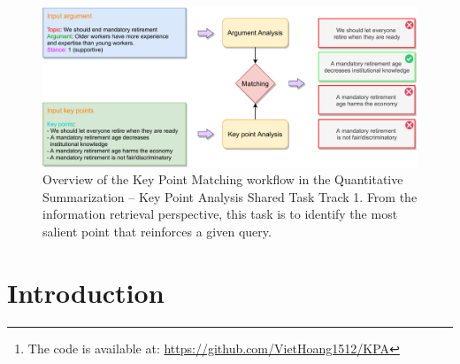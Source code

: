 \begin{figure}[ht!]
\centering
\includegraphics[scale=0.74]{figures/KPA-workflow.pdf}
\caption{Overview of the Key Point Matching workflow in the Quantitative Summarization – Key Point Analysis Shared Task Track 1. From the information retrieval perspective, this task is to identify the most salient point that reinforces a given query.}
\label{fig:workflow}
\end{figure}


\begin{abstract}
Key Point Analysis (KPA) is one of the most essential tasks in building an Opinion Summarization system, which is capable of generating key points for a collection of arguments toward a particular topic. Furthermore, KPA allows quantifying the coverage of each summary by counting its matched arguments. With the aim of creating high-quality summaries, it is necessary to have an in-depth understanding of each individual argument as well as its universal semantic in a specified context. In this paper, we introduce a promising model, named Matching the Statements (MTS) that incorporates the discussed topic information into arguments/key points comprehension to fully understand their meanings, thus accurately performing ranking and retrieving best-match key points for an input argument. Our approach\footnote{The code is available at: \url{https://github.com/VietHoang1512/KPA}} has achieved the $4^{th}$ place in Track 1 of the Quantitative Summarization – Key Point Analysis Shared Task by IBM, yielding a competitive performance of $0.8956\:(3^{rd})$ and $0.9632\:(7^{th})$ strict and relaxed mean Average Precision, respectively.
\end{abstract}

\section{Introduction}
\label{sec:intro}

